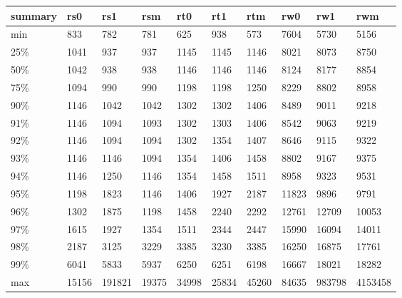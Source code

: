 \begin{tabular}{llllllllll}
\toprule
summary &    rs0 &     rs1 &    rsm &    rt0 &    rt1 &    rtm &    rw0 &     rw1 &      rwm \\
\midrule
    min &    833 &     782 &    781 &    625 &    938 &    573 &   7604 &    5730 &     5156 \\
    25\% &   1041 &     937 &    937 &   1145 &   1145 &   1146 &   8021 &    8073 &     8750 \\
    50\% &   1042 &     938 &    938 &   1146 &   1146 &   1146 &   8124 &    8177 &     8854 \\
    75\% &   1094 &     990 &    990 &   1198 &   1198 &   1250 &   8229 &    8802 &     8958 \\
    90\% &   1146 &    1042 &   1042 &   1302 &   1302 &   1406 &   8489 &    9011 &     9218 \\
    91\% &   1146 &    1094 &   1093 &   1302 &   1303 &   1406 &   8542 &    9063 &     9219 \\
    92\% &   1146 &    1094 &   1094 &   1302 &   1354 &   1407 &   8646 &    9115 &     9322 \\
    93\% &   1146 &    1146 &   1094 &   1354 &   1406 &   1458 &   8802 &    9167 &     9375 \\
    94\% &   1146 &    1250 &   1146 &   1354 &   1458 &   1511 &   8958 &    9323 &     9531 \\
    95\% &   1198 &    1823 &   1146 &   1406 &   1927 &   2187 &  11823 &    9896 &     9791 \\
    96\% &   1302 &    1875 &   1198 &   1458 &   2240 &   2292 &  12761 &   12709 &    10053 \\
    97\% &   1615 &    1927 &   1354 &   1511 &   2344 &   2447 &  15990 &   16094 &    14011 \\
    98\% &   2187 &    3125 &   3229 &   3385 &   3230 &   3385 &  16250 &   16875 &    17761 \\
    99\% &   6041 &    5833 &   5937 &   6250 &   6251 &   6198 &  16667 &   18021 &    18282 \\
    max &  15156 &  191821 &  19375 &  34998 &  25834 &  45260 &  84635 &  983798 &  4153458 \\
\bottomrule
\end{tabular}
